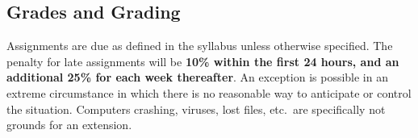 \documentclass[11pt]{article}
\newcommand{\todo}[1]{\vspace{5 mm}\par \noindent
\marginpar{\textsc{ToDo}}
\framebox{\begin{minipage}[c]{0.95 \textwidth}
\tt #1 \end{minipage}}\vspace{5 mm}\par}
\begin{document}
%
%

\subsection{Grades and Grading}
Assignments are due as defined in the syllabus unless otherwise
specified. The penalty for late assignments will be \textbf{10\% within the
	first 24 hours, and an additional 25\% for each week thereafter}. An
exception is possible in an extreme circumstance in which
there is no reasonable way to anticipate or control the
situation. Computers crashing, viruses, lost files, etc.\ are
specifically not grounds for an extension.
\end{document}
